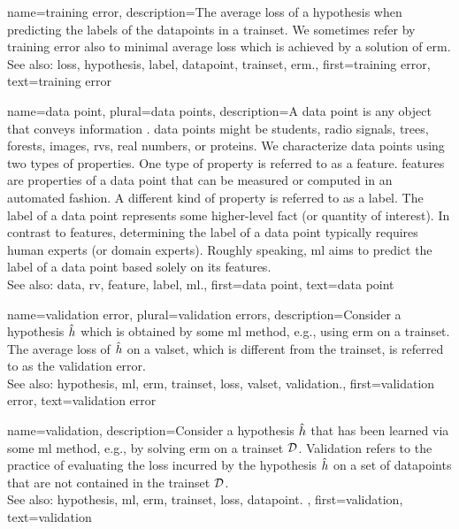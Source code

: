 {name={training error},
	description={The average \gls{loss} of a \gls{hypothesis} when 
		predicting the \glspl{label} of the \glspl{datapoint} in a \gls{trainset}. 
		We sometimes refer by training error also to minimal average \gls{loss} 
		which is achieved by a solution of \gls{erm}.
				\\
		See also: \gls{loss}, \gls{hypothesis}, \gls{label}, \gls{datapoint}, \gls{trainset}, \gls{erm}.},
	first={training error},
	text={training error}  
}

{name={data point}, plural={data points},
	description={A \gls{data} point is any object that conveys information \cite{coverthomas}. \Gls{data} points might be 
		students, radio signals, trees, forests, images, \glspl{rv}, real numbers, or proteins. We characterize \gls{data} points 
		using two types of properties. One type of property is referred to as a \gls{feature}. \Glspl{feature} are properties of a 
		\gls{data} point that can be measured or computed in an automated fashion. 
		A different kind of property is referred to as a \gls{label}. The \gls{label} of 
		a \gls{data} point represents some higher-level fact (or quantity of interest). In 
		contrast to \glspl{feature}, determining the \gls{label} of a \gls{data} point typically 
		requires human experts (or domain experts). Roughly speaking, \gls{ml} aims to predict 
		the \gls{label} of a \gls{data} point based solely on its \glspl{feature}. 
				\\
		See also: \gls{data}, \gls{rv}, \gls{feature}, \gls{label}, \gls{ml}.}, 
	first={data point},
	text={data point}  
}


{name={validation error}, plural={validation errors},
 	description={Consider a \gls{hypothesis} $\hat{h}$ which is 
 		obtained by some \gls{ml} method, e.g., using \gls{erm} on a \gls{trainset}. The average \gls{loss} 
 		of $\hat{h}$ on a \gls{valset}, which is different from the \gls{trainset}, is referred 
 		to as the \gls{validation} error.
			\\
		See also: \gls{hypothesis}, \gls{ml}, \gls{erm}, \gls{trainset}, \gls{loss}, \gls{valset}, \gls{validation}.},
	first={validation error},
	text={validation error}  
}

{name={validation},
	description={Consider a \gls{hypothesis} $\hat{h}$ that has been 
		learned via some \gls{ml} method, e.g., by solving \gls{erm} on a \gls{trainset} $\mathcal{D}$. 
		Validation refers to the practice of evaluating the \gls{loss} incurred by the 
		\gls{hypothesis} $\hat{h}$ on a set of 
		\glspl{datapoint} that are not contained in the \gls{trainset} $\mathcal{D}$.
				\\
		See also: \gls{hypothesis}, \gls{ml}, \gls{erm}, \gls{trainset}, \gls{loss}, \gls{datapoint}. },
	first={validation},
	text={validation}  
}

